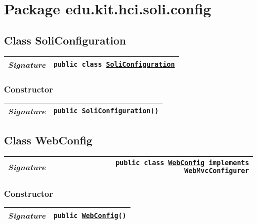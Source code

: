 

\section{Package edu.kit.hci.soli.config}
\begin{adjustwidth}{1.5em}{0pt}
  \subsection{Class SoliConfiguration\label{edu.kit.hci.soli.config.SoliConfiguration} }
  \begin{adjustwidth}{1.5em}{0pt}
    {\begin{tabularx}{1.0\linewidth}{@{}l R@{}}
      \emph{Signature} & \texttt{public  class \texttt{\hyperref[edu.kit.hci.soli.config.SoliConfiguration]{\texttt{SoliConfiguration}}}} \\
      \hline
  
    \end{tabularx}}\subsubsection{Constructor\label{edu.kit.hci.soli.config.SoliConfiguration@edu.kit.hci.soli.config.SoliConfiguration()}}
    \begin{adjustwidth}{1.5em}{0pt}
      {\begin{tabularx}{1.0\linewidth}{@{}l R@{}}
        \emph{Signature} & \texttt{public \texttt{\hyperref[edu.kit.hci.soli.config.SoliConfiguration]{\texttt{SoliConfiguration}}}()} \\
        \hline
  
      \end{tabularx}}
    \end{adjustwidth}
  \end{adjustwidth}\subsection{Class WebConfig\label{edu.kit.hci.soli.config.WebConfig} }
  \begin{adjustwidth}{1.5em}{0pt}
    {\begin{tabularx}{1.0\linewidth}{@{}l R@{}}
      \emph{Signature} & \texttt{public  class \texttt{\hyperref[edu.kit.hci.soli.config.WebConfig]{\texttt{WebConfig}} implements \texttt{WebMvcConfigurer}}} \\
      \hline
  
    \end{tabularx}}\subsubsection{Constructor\label{edu.kit.hci.soli.config.WebConfig@edu.kit.hci.soli.config.WebConfig()}}
    \begin{adjustwidth}{1.5em}{0pt}
      {\begin{tabularx}{1.0\linewidth}{@{}l R@{}}
        \emph{Signature} & \texttt{public \texttt{\hyperref[edu.kit.hci.soli.config.WebConfig]{\texttt{WebConfig}}}()} \\
        \hline
  

\end{tabularx}}
\end{adjustwidth}
\end{adjustwidth}
\end{adjustwidth}
